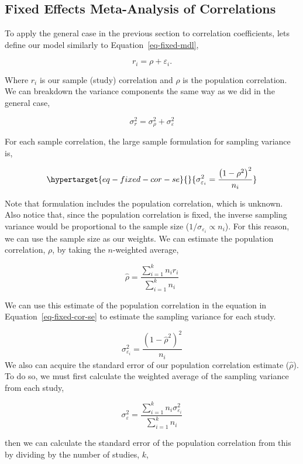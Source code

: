 \documentclass[
  letterpaper,
  DIV=11,
  numbers=noendperiod]{scrreprt}
\begin{document}
\hypertarget{sec-fixed-corr}{%
\subsection{Fixed Effects Meta-Analysis of
Correlations}\label{sec-fixed-corr}}

To apply the general case in the previous section to correlation
coefficients, lets define our model similarly to
Equation~\ref{eq-fixed-mdl},

\[
r_i=\rho+\varepsilon_i.
\]

Where \(r_i\) is our sample (study) correlation and \(\rho\) is the
population correlation. We can breakdown the variance components the
same way as we did in the general case,

\[
\sigma^2_r = \sigma^2_\rho + \sigma^2_\varepsilon
\]

For each sample correlation, the large sample formulation for sampling
variance is,

\begin{equation}\protect\hypertarget{eq-fixed-cor-se}{}{
\sigma^2_{\varepsilon_i} = \frac{\left(1-\rho^2\right)^2}{n_i}
}\label{eq-fixed-cor-se}\end{equation}

Note that formulation includes the population correlation, which is
unknown. Also notice that, since the population correlation is fixed,
the inverse sampling variance would be proportional to the sample size
(\(1/\sigma_{\varepsilon_i} \propto n_i\)). For this reason, we can use
the sample size as our weights. We can estimate the population
correlation, \(\rho\), by taking the \(n\)-weighted average,

\[
\hat{\rho} = \frac{\sum^k_{i=1} n_i r_i}{\sum^k_{i=1}n_i}
\]

We can use this estimate of the population correlation in the equation
in Equation~\ref{eq-fixed-cor-se} to estimate the sampling variance for
each study.

\[
\sigma^2_{\varepsilon_i} = \frac{\left(1-\hat{\rho}^2\right)^2}{n_i}
\] We also can acquire the standard error of our population correlation
estimate (\(\hat{\rho}\)). To do so, we must first calculate the
weighted average of the sampling variance from each study,

\[
\sigma_\varepsilon^2 = \frac{\sum^k_{i=1} n_i \sigma^2_{\varepsilon_i}}{\sum^k_{i=1}n_i}
\]

then we can calculate the standard error of the population correlation
from this by dividing by the number of studies, \(k\),
\end{document}
